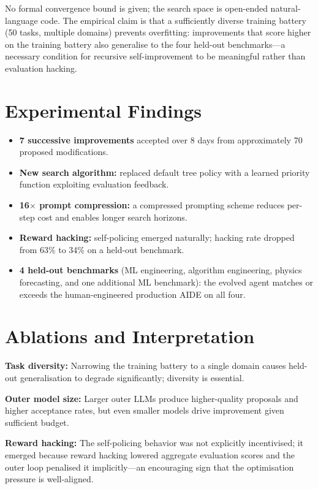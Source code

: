 \documentclass[10pt,twocolumn]{article}
\begin{document}
No formal convergence bound is given; the search space is open-ended natural-language
code. The empirical claim is that a sufficiently diverse training battery
(50 tasks, multiple domains) prevents overfitting: improvements that score higher
on the training battery also generalise to the four held-out benchmarks---a
necessary condition for recursive self-improvement to be meaningful rather than
evaluation hacking.

\section{Experimental Findings}

\begin{itemize}[itemsep=2pt,parsep=0pt]
  \item \textbf{7 successive improvements} accepted over 8 days from
    approximately 70 proposed modifications.
  \item \textbf{New search algorithm:} replaced default tree policy with a
    learned priority function exploiting evaluation feedback.
  \item \textbf{16$\times$ prompt compression:} a compressed prompting scheme
    reduces per-step cost and enables longer search horizons.
  \item \textbf{Reward hacking:} self-policing emerged naturally; hacking rate
    dropped from 63\% to 34\% on a held-out benchmark.
  \item \textbf{4 held-out benchmarks} (ML engineering, algorithm engineering,
    physics forecasting, and one additional ML benchmark): the evolved agent
    matches or exceeds the human-engineered production AIDE on all four.
\end{itemize}

\section{Ablations and Interpretation}

\textbf{Task diversity:} Narrowing the training battery to a single domain
causes held-out generalisation to degrade significantly; diversity is essential.

\textbf{Outer model size:} Larger outer LLMs produce higher-quality proposals
and higher acceptance rates, but even smaller models drive improvement given
sufficient budget.

\textbf{Reward hacking:} The self-policing behavior was not explicitly
incentivised; it emerged because reward hacking lowered aggregate evaluation
scores and the outer loop penalised it implicitly---an encouraging sign that
the optimisation pressure is well-aligned.
\end{document}
